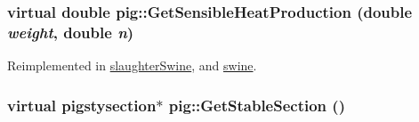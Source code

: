 \label{classpig_a39f938b4e819af79b288eadaf19e9f35}
\hypertarget{classpig_a2c7c1a356646211e31753de053977520}{
\subsubsection[{GetSensibleHeatProduction}]{\setlength{\rightskip}{0pt plus 5cm}virtual double pig::GetSensibleHeatProduction (double {\em weight}, \/  double {\em n})}}
\label{classpig_a2c7c1a356646211e31753de053977520}


Reimplemented in \hyperlink{classslaughter_swine_a46e7d9f7b8959aaf973d82cced115232}{slaughterSwine}, and \hyperlink{classswine_ab379109f2fea2e0fe5e649b8c59df202}{swine}.\hypertarget{classpig_a2320d7f431264ffed833fc93182787bb}{
\subsubsection[{GetStableSection}]{\setlength{\rightskip}{0pt plus 5cm}virtual {\bf pigstysection}$\ast$ pig::GetStableSection ()}}
\label{classpig_a2320d7f431264ffed833fc93182787bb}


